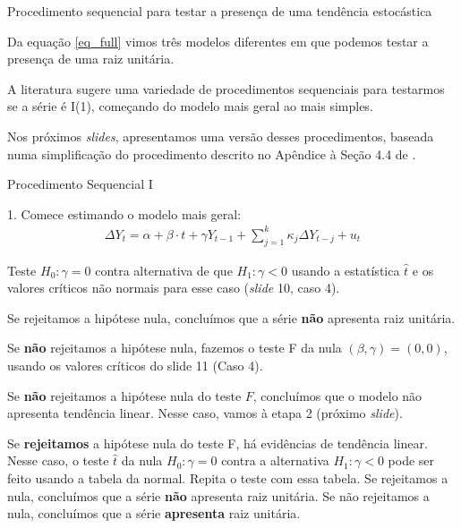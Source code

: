 \documentclass[11pt]{beamer}
\newenvironment{wideitemize}{\itemize\addtolength{\itemsep}{10pt}}{\enditemize}
\newenvironment{halfwideenumerate}{\enumerate\addtolength{\itemsep}{0.5em}}{\endenumerate}
\begin{document}
\begin{frame}{Procedimento sequencial para testar a presença de uma tendência estocástica}
	\begin{wideitemize}
		\item Da equação \eqref{eq_full} vimos três modelos diferentes em que podemos testar a presença de uma raiz unitária.
		\item A literatura sugere uma variedade de procedimentos {\color{blue}sequenciais} para testarmos se a série é I(1), começando do modelo mais geral ao mais simples.
		\item Nos próximos \textit{slides}, apresentamos uma versão desses procedimentos, baseada numa simplificação do procedimento descrito no Apêndice à Seção 4.4 de \citet{Enders2014}.
		
	\end{wideitemize}
\end{frame}

\begin{frame}{Procedimento Sequencial I}

	
		{ 1.} Comece estimando o modelo mais geral:
		\begin{equation*}
			\begin{aligned}
				\Delta Y_t = \alpha + \beta \cdot t + \gamma Y_{t-1}  +\sum_{j=1}^k \kappa_j\Delta Y_{t-j} + u_t
			\end{aligned}
		\end{equation*}
		
		Teste $H_0: \gamma = 0$ contra alternativa de que $H_1: \gamma < 0$ usando a estatística $\hat{t}$ e os valores críticos não normais para esse caso (\textit{slide} 10, caso 4).
		\begin{halfwideenumerate}
					\small
			\item Se rejeitamos a hipótese nula, concluímos que a série \textbf{não} apresenta raiz unitária.
			\item Se \textbf{não} rejeitamos a hipótese nula, fazemos o teste F da nula $(\beta, \gamma)=(0,0)$, usando os valores críticos do slide 11 (Caso 4).
			\begin{halfwideenumerate}
\footnotesize
				\item Se \textbf{não} rejeitamos a hipótese  nula do teste $F$, concluímos que o modelo não apresenta tendência linear. Nesse caso, vamos à etapa 2 (próximo \textit{slide}).
				\item Se \textbf{rejeitamos} a hipótese nula do teste F, há evidências de tendência linear. Nesse caso, o teste $\hat{t}$ da nula $H_0: \gamma = 0$ contra a alternativa  $H_1: \gamma < 0$ pode ser feito usando a tabela da normal. Repita o teste com essa tabela. Se rejeitamos a nula, concluímos que a série \textbf{não} apresenta raiz unitária. Se não rejeitamos a nula, concluímos que a série \textbf{apresenta} raiz unitária.
			\end{halfwideenumerate}
		\end{halfwideenumerate}
		

	
\end{frame}
\end{document}
